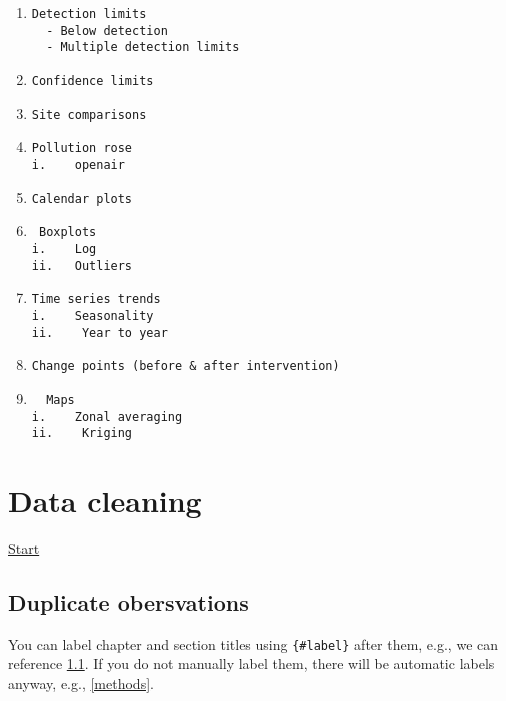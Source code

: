 \documentclass[14pt,]{book}
\theoremstyle{definition}
\theoremstyle{definition}
\theoremstyle{remark}
\begin{document}
\begin{enumerate}
\def\labelenumi{\alph{enumi}.}
\item
\begin{verbatim}
Detection limits  
  - Below detection 
  - Multiple detection limits  
\end{verbatim}
\item
\begin{verbatim}
Confidence limits  
\end{verbatim}
\item
\begin{verbatim}
Site comparisons  
\end{verbatim}
\item
\begin{verbatim}
Pollution rose  
i.    openair  
\end{verbatim}
\item
\begin{verbatim}
Calendar plots  
\end{verbatim}
\item
\begin{verbatim}
 Boxplots  
i.    Log  
ii.   Outliers  
\end{verbatim}
\item
\begin{verbatim}
Time series trends  
i.    Seasonality  
ii.    Year to year  
\end{verbatim}
\item
\begin{verbatim}
Change points (before & after intervention)  
\end{verbatim}
\item
\begin{verbatim}
  Maps  
i.    Zonal averaging  
ii.    Kriging  
\end{verbatim}
\end{enumerate}

\chapter{Data cleaning}\label{data-cleaning}

\protect\hyperlink{start}{Start}

\hypertarget{start}{\section{Duplicate obersvations}\label{start}}

You can label chapter and section titles using \texttt{\{\#label\}}
after them, e.g., we can reference \ref{start}. If you do not manually
label them, there will be automatic labels anyway, e.g., \ref{methods}.
\end{document}

